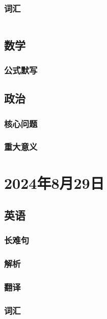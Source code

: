 \documentclass[UTF8]{ctexart}
\begin{document}
\subsubsection{词汇}
\begin{table}[h]
      \centering
      \begin{tabular}{p{}p{}}
      \end{tabular}
\end{table}
\subsection{数学}
\subsubsection{公式默写}
\begin{multicols}{2}
\end{multicols}
\subsection{政治}
\subsubsection{}
\subsubsection{核心问题}
\subsubsection{重大意义}
\section{2024年8月29日}
\subsection{英语}
\subsubsection{长难句}
\subsubsection{解析}
\subsubsection{翻译}
\subsubsection{词汇}
\begin{table}[h]
      \centering
      \begin{tabular}{p{}p{}}
      \end{tabular}
\end{table}
\end{document}
